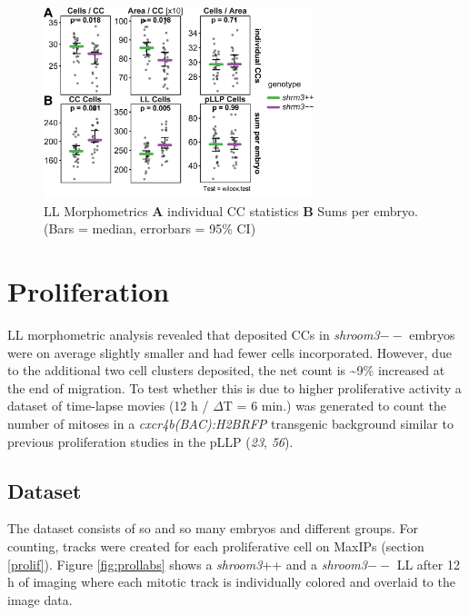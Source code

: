 \documentclass[11pt,singlespacinge,twoside]{reedthesis} %
\begin{document}
\begin{figure}

{\centering \includegraphics[width=0.7\textwidth]{figures/results/01_morphometrics/ll_clusters} 

}

\caption[LL Morphometrics]{LL Morphometrics \textbf{A} individual CC statistics \textbf{B} Sums per embryo. (Bars = median, errorbars = 95\% CI)}\label{fig:llclus}
\end{figure}
\hypertarget{proliferation}{%
\section{Proliferation}\label{proliferation}}

LL morphometric analysis revealed that deposited CCs in \emph{shroom3}\(--\) embryos were on average slightly smaller and had fewer cells incorporated. However, due to the additional two cell clusters deposited, the net count is \textasciitilde{}9\(\%\) increased at the end of migration.
To test whether this is due to higher proliferative activity a dataset of time-lapse movies (12 h / \(\Delta\)T = 6 min.) was generated to count the number of mitoses in a \emph{cxcr4b(BAC):H2BRFP} transgenic background similar to previous proliferation studies in the pLLP (\emph{23}, \emph{56}).

\hypertarget{dataset-1}{%
\subsection{Dataset}\label{dataset-1}}

The dataset consists of so and so many embryos and different groups. For counting, tracks were created for each proliferative cell on MaxIPs (section \ref{prolif}). Figure \ref{fig:prollabs} shows a \emph{shroom3}++ and a \emph{shroom3}\(--\) LL after 12 h of imaging where each mitotic track is individually colored and overlaid to the image data.
\end{document}
